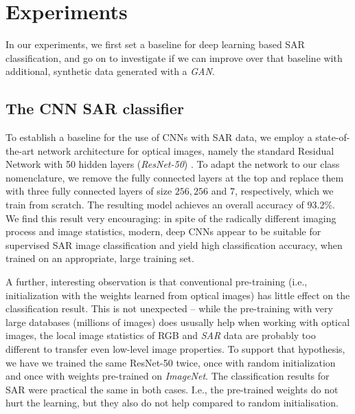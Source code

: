\documentclass{article}
\begin{document}
\section{Experiments}
\label{sec:experimnts}

In our experiments, we first set a baseline for deep learning based
SAR classification, and go on to investigate if we can improve over
that baseline with additional, synthetic data generated with a
\emph{GAN}.

\subsection{The CNN SAR classifier}

To establish a baseline for the use of CNNs with SAR data, we employ a
state-of-the-art network architecture for optical images, namely the
standard Residual Network with 50 hidden layers (\emph{ResNet-50})
\cite{he2016deep}.
%
To adapt the network to our class nomenclature, we remove the fully
connected layers at the top and replace them with three fully
connected layers of size $256, 256$ and $7$, respectively, which we
train from scratch. The resulting model achieves an overall accuracy
of $93.2\%$. We find this result very encouraging: in spite of the
radically different imaging process and image statistics, modern, deep
CNNs appear to be suitable for supervised SAR image classification and
yield high classification accuracy, when trained on an appropriate,
large training set.

\smallskip

\noindent
A further, interesting observation is that conventional pre-training
(i.e., initialization with the weights learned from optical images)
has little effect on the classification result.
%
This is not unexpected -- while the pre-training with very large
databases (millions of images) does ususally help when working with
optical images, the local image statistics of RGB and \emph{SAR} data
are probably too different to transfer even low-level image
properties.
%
To support that hypothesis, we have we trained the same ResNet-50
twice, once with random initialization and once with weights
pre-trained on \emph{ImageNet}. The classification results for SAR
were practical the same in both cases. I.e., the pre-trained weights
do not hurt the learning, but they also do not help compared to random
initialisation.
\end{document}
